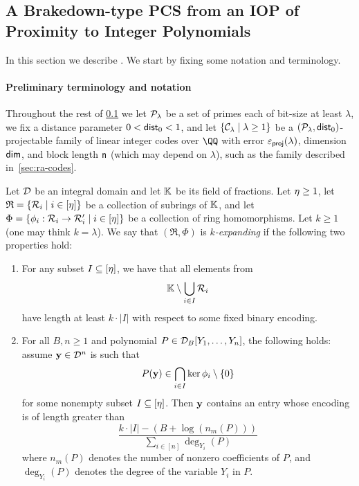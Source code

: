 \documentclass[11pt,letterpaper,usenames,dvipsnames]{article}
\begin{document}
\subsection{A Brakedown-type PCS from an IOP of Proximity to Integer Polynomials}
\label{sec:brakedown-over-q}

In this section we describe \zipp. We start by fixing some notation and terminology.  

\paragraph{Preliminary terminology and notation}
Throughout the rest of \cref{sec:brakedown-over-q}  we let ${\mathcal{P}_{\lambda}}$ be a set of primes each of bit-size at least $\lambda$, we fix a distance parameter $0<\mathsf{dist}_0<1$, and let $\{{\mathcal{C}_{\lambda}}\mid \lambda \geq 1\}$ be a $({\mathcal{P}_{\lambda}},\mathsf{dist}_0)$-projectable family of linear integer codes over $\QQ$ with error $\varepsilon_{{\mathsf{proj}}}(\lambda)$, dimension $\mathsf{dim}$, and block length $\mathsf{n}$  (which may depend on $\lambda$), such as the family described in~\cref{sec:ra-codes}. 

\begin{definition}
\label{def:expanding-family-of-homomorphisms}
 Let $\mathcal{D}$ be an integral domain and let $\mathbb{K}$ be its field of fractions.     Let $\eta\geq 1$, let $\mathfrak{R}=\{\mathcal{R}_i\mid i\in [\eta]\}$ be a collection of subrings of $\mathbb{K}$, and let $\Phi=\{\phi_i: \mathcal{R}_i \to \mathcal{R}_i' \mid i\in [\eta]\}$ be a collection of ring homomorphisms. Let $k\geq 1$ (one may think $k= \lambda$). We say that $(\mathfrak{R}, \Phi)$  is \emph{$k$-expanding} if the following two properties hold:
\begin{enumerate}
  \item  For any subset $I\subseteq [\eta]$, we have that all elements from
  \[
  \mathbb{K} \setminus \bigcup_{i\in I} \mathcal{R}_i
  \]
  have length at least ${k\cdot |I|}$ with respect to some fixed binary encoding. 
  \item For all $B,n\geq 1$ and polynomial $P\in \mathcal{D}_B[Y_1,\ldots, Y_n]$, the following holds: assume $\mathbf{y}\in \mathcal{D}^{n}$ is such that
  \[
  P(\mathbf{y}) \in  \bigcap_{i\in I} \ker \phi_i \setminus \{0\}
  \]
  for some nonempty subset $I\subseteq [\eta]$. Then $\mathbf{y}$ contains an entry whose encoding is of length greater than
  \[
  \frac{k \cdot |I| - (B + \log(n_m(P)))}{\sum_{i\in[n]}\deg_{Y_i}(P)}
  \]
  where $n_m(P)$ denotes the number of nonzero coefficients of $P$, and $\deg_{Y_i}(P)$ denotes the degree of the variable $Y_i$ in $P$.
\end{enumerate}
\end{definition}
\end{document}
